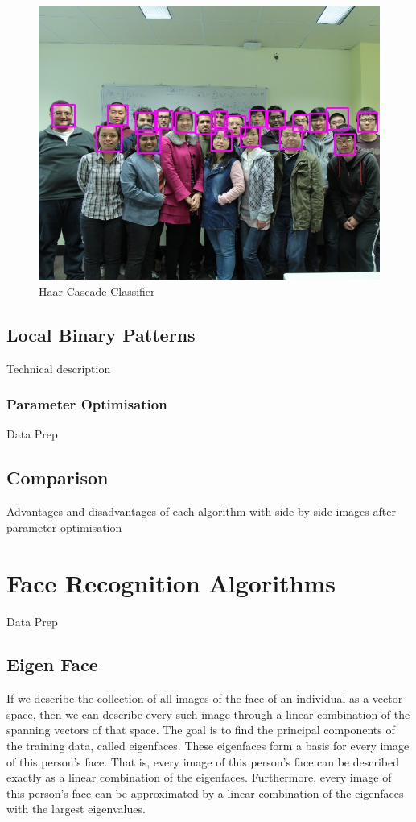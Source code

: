 \documentclass{article}
\begin{document}
\begin{figure}
\centering
\includegraphics{./waiting_room_detected} %
\caption{Haar Cascade Classifier}
\label{fig:haar_cascade}
\end{figure}


\subsection{Local Binary Patterns}
Technical description
\subsubsection{Parameter Optimisation}
Data Prep

\subsection{Comparison}
Advantages and disadvantages of each algorithm with side-by-side images after parameter optimisation


\section{Face Recognition Algorithms}
Data Prep

\subsection{Eigen Face}
If we describe the collection of all images of the face of an individual as a vector space, then we can describe every such image through a linear combination of the spanning vectors of that space.
The goal is to find the principal components of the training data, called eigenfaces. These eigenfaces form a basis for every image of this person’s face. That is, every image of this person’s face can be described exactly as a linear combination of the eigenfaces. Furthermore, every image of this person’s face can be approximated by a linear combination of the eigenfaces with the largest eigenvalues.
\end{document}
